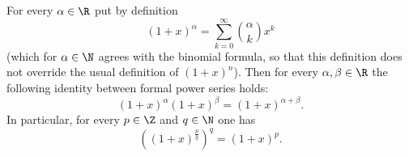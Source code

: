 

\setcounter{section}{2}
\setcounter{subsection}{4}
\setcounter{dfn}{17}

\begin{cor}
\label{cor:GenBinom}
For every $\alpha \in \R$ put by definition
\[
(1 + x)^\alpha = \sum_{k=0}^\infty \binom{\alpha}{k} x^k
\]
(which for $\alpha \in \N$ agrees with the binomial formula, so that this definition does not override the usual definition of $(1+x)^n$).
Then for every $\alpha, \beta \in \R$ the following identity between formal power series holds:
\[
(1+x)^\alpha (1+x)^\beta = (1+x)^{\alpha + \beta}.
\]
In particular, for every $p \in \Z$ and $q \in \N$ one has
\[
\left( (1+x)^{\frac{p}{q}} \right)^q = (1+x)^p.
\]
\end{cor}


